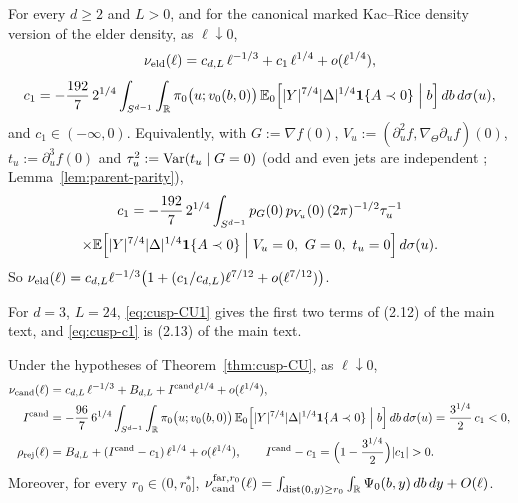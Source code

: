 \begin{theorem}\label{thm:cusp-CU}
For every $d\ge2$ and $L>0$, and for the canonical marked Kac--Rice density version of the elder density, as $\ell\downarrow0$,
\begin{equation}\label{eq:cusp-CU1}
\nu_{\mathrm{eld}}(\ell)=c_{d,L}\,\ell^{-1/3}+c_1\,\ell^{1/4}+o(\ell^{1/4}),
\end{equation}
\begin{equation}\label{eq:cusp-c1}
c_1=-\frac{192}7\,2^{1/4}\int_{S^{d-1}}\int_\mathbb R\pi_0\bigl(u;v_0(b,0)\bigr)\,\mathbb E_0\Bigl[|Y|^{7/4}|\Delta|^{1/4}\mathbf 1\{A\prec0\}\Bigm|b\Bigr]\,db\,d\sigma(u),
\end{equation}
and $c_1\in(-\infty,0)$. Equivalently, with $G:=\nabla f(0)$, $V_u:=(\partial_u^2f,\nabla_\Theta\partial_uf)(0)$, $t_u:=\partial_u^3f(0)$ and $\tau_u^2:=\operatorname{Var}(t_u\mid G=0)$ (odd and even jets are independent \cite[\S15]{parentP}; Lemma~\ref{lem:parent-parity}),
\begin{multline}\label{eq:cusp-c1parity}
c_1=-\frac{192}7\,2^{1/4}\int_{S^{d-1}}p_G(0)\,p_{V_u}(0)\,(2\pi)^{-1/2}\tau_u^{-1}\\
\times\E\Bigl[|Y|^{7/4}|\Delta|^{1/4}\ind\{A\prec0\}\Bigm|V_u=0,\ G=0,\ t_u=0\Bigr]\,d\sigma(u).
\end{multline}
So $\nu_{\mathrm{eld}}(\ell)=c_{d,L}\ell^{-1/3}\bigl(1+(c_1/c_{d,L})\ell^{7/12}+o(\ell^{7/12})\bigr)$.
\end{theorem}

For $d=3$, $L=24$, \eqref{eq:cusp-CU1} gives the first two terms of (2.12) of the main text, and \eqref{eq:cusp-c1} is (2.13) of the main text.

\begin{theorem}\label{thm:cusp-CUprime}
Under the hypotheses of Theorem~\ref{thm:cusp-CU}, as $\ell\downarrow0$,
\begin{align}
\nu_{\cand}(\ell)&=c_{d,L}\,\ell^{-1/3}+B_{d,L}+I^{\cand}\ell^{1/4}+o(\ell^{1/4}),\label{eq:cusp-CUp1}\\
I^{\cand}&=-\frac{96}7\,6^{1/4}\int_{S^{d-1}}\int_\R\pi_0\bigl(u;v_0(b,0)\bigr)\,\E_0\Bigl[|Y|^{7/4}|\Delta|^{1/4}\ind\{A\prec0\}\Bigm|b\Bigr]\,db\,d\sigma(u)=\frac{3^{1/4}}2\,c_1<0,\label{eq:cusp-Icand}\\
\rho_{\rej}(\ell)&=B_{d,L}+(I^{\cand}-c_1)\,\ell^{1/4}+o(\ell^{1/4}),\qquad I^{\cand}-c_1=\Bigl(1-\frac{3^{1/4}}2\Bigr)|c_1|>0 .\label{eq:cusp-CUp2}
\end{align}
Moreover, for every $r_0\in(0,r_0^*]$, $\nu_{\mathrm{cand}}^{\mathrm{far},r_0}(\ell)=\int_{\operatorname{dist}(0,y)\ge r_0}\int_\mathbb R\Psi_0(b,y)\,db\,dy+O(\ell)$.
\end{theorem}

